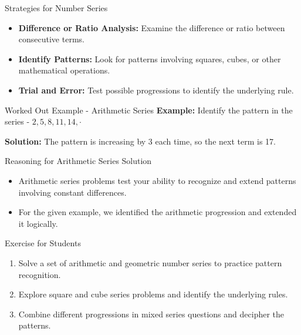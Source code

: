 \begin{frame}{Strategies for Number Series}
  \begin{itemize}
    \item \textbf{Difference or Ratio Analysis:} Examine the difference or ratio between consecutive terms.
    \item \textbf{Identify Patterns:} Look for patterns involving squares, cubes, or other mathematical operations.
    \item \textbf{Trial and Error:} Test possible progressions to identify the underlying rule.
  \end{itemize}
\end{frame}

\begin{frame}{Worked Out Example - Arithmetic Series}
  \textbf{Example:} Identify the pattern in the series - \(2, 5, 8, 11, 14, \cdot\)

  \textbf{Solution:} The pattern is increasing by 3 each time, so the next term is 17.
\end{frame}

\begin{frame}{Reasoning for Arithmetic Series Solution}
  \begin{itemize}
    \item Arithmetic series problems test your ability to recognize and extend patterns involving constant differences.
    \item For the given example, we identified the arithmetic progression and extended it logically.
  \end{itemize}
\end{frame}

\begin{frame}{Exercise for Students}
  \begin{enumerate}
    \item Solve a set of arithmetic and geometric number series to practice pattern recognition.
    \item Explore square and cube series problems and identify the underlying rules.
    \item Combine different progressions in mixed series questions and decipher the patterns.
  \end{enumerate}
\end{frame}
